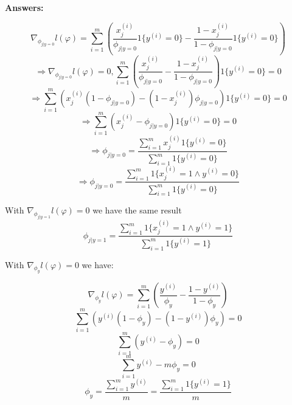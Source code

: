 \documentclass[a4paper,14pt]{article}
\begin{document}
\begin{enumerate}[label=(\alph*)]
\textbf{Answers:}

\begin{equation}
    \nabla_{\phi_{j|y=0}} l(\varphi) = \sum_{i=1}^{m} \left( \frac{x_{j}^{(i)}}{\phi_{j|y=0}}1\{y^{(i)}=0\} - \frac{1-x_{j}^{(i)}}{1-\phi_{j|y=0}}1\{y^{(i)}=0\} \right)
\end{equation}
\begin{equation}
    \Rightarrow \nabla_{\phi_{j|y=0}} l(\varphi) = 0, \sum_{i=1}^{m} \left( \frac{x_{j}^{(i)}}{\phi_{j|y=0}} - \frac{1-x_{j}^{(i)}}{1-\phi_{j|y=0}} \right)1\{y^{(i)}=0\}=0
\end{equation}
\begin{equation}
    \Rightarrow \sum_{i=1}^{m} \left( x_{j}^{(i)}(1-\phi_{j|y=0}) - (1-x_{j}^{(i)})\phi_{j|y=0} \right)1\{y^{(i)}=0\}=0
\end{equation}
\begin{equation}
    \Rightarrow \sum_{i=1}^{m} \left( x_{j}^{(i)} - \phi_{j|y=0} \right) 1\{ y^{(i)} = 0 \} = 0
\end{equation}
\begin{equation}
    \Rightarrow \phi_{j|y=0} = \frac{ \sum_{i=1}^{m} x_{j}^{(i)}1\{y^{(i)}= 0\}}{\sum_{i=1}^{m}1\{y^{(i)}= 0\}}
\end{equation}
\begin{equation}
    \Rightarrow \phi_{j|y=0} = \frac{ \sum_{i=1}^{m} 1\{x_{j}^{(i)} = 1 \wedge y^{(i)}= 0\}}{\sum_{i=1}^{m}1\{y^{(i)}= 0\}}
\end{equation}

With $\nabla_{\phi_{j|y=1}} l(\varphi) = 0$ we have the same result
\begin{equation}
    \phi_{j|y=1} = \frac{ \sum_{i=1}^{m} 1\{x_{j}^{(i)} = 1 \wedge y^{(i)}= 1\}}{\sum_{i=1}^{m}1\{y^{(i)}= 1\}}
\end{equation}

With $\nabla_{\phi_{y}} l(\varphi) = 0$ we have:

\begin{equation}
    \nabla_{\phi_{y}} l(\varphi) = \sum_{i=1}^{m} \left( \frac{y^{(i)}}{\phi_{y}} - \frac{1-y^{(i)}}{1-\phi_{y}} \right)
\end{equation}
\begin{equation}
    \sum_{i=1}^{m} \left( y^{(i)}(1-\phi_{y}) - (1-y^{(i)})\phi_{y} \right) = 0
\end{equation}
\begin{equation}
    \sum_{i=1}^{m} \left( y^{(i)}-\phi_{y} \right) = 0
\end{equation}
\begin{equation}
    \sum_{i=1}^{m}y^{(i)}-m\phi_{y} = 0
\end{equation}
\begin{equation}
    \phi_{y} = \frac{\sum_{i=1}^{m}y^{(i)}}{m} = \frac{\sum_{i=1}^{m}1\{y^{(i)}=1\}}{m}
\end{equation}


\end{enumerate}
\end{document}

